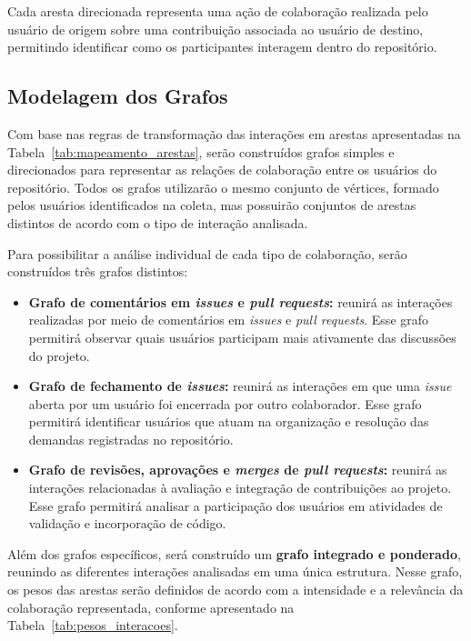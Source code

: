 \documentclass[12pt]{article}
\begin{document}
Cada aresta direcionada representa uma ação de colaboração realizada pelo usuário de origem sobre uma contribuição associada ao usuário de destino, permitindo identificar como os participantes interagem dentro do repositório.

\subsection{Modelagem dos Grafos}

Com base nas regras de transformação das interações em arestas apresentadas na Tabela~\ref{tab:mapeamento_arestas}, serão construídos grafos simples e direcionados para representar as relações de colaboração entre os usuários do repositório. Todos os grafos utilizarão o mesmo conjunto de vértices, formado pelos usuários identificados na coleta, mas possuirão conjuntos de arestas distintos de acordo com o tipo de interação analisada.

Para possibilitar a análise individual de cada tipo de colaboração, serão construídos três grafos distintos:

\begin{itemize}
    \item \textbf{Grafo de comentários em \textit{issues} e \textit{pull requests}:} reunirá as interações realizadas por meio de comentários em \textit{issues} e \textit{pull requests}. Esse grafo permitirá observar quais usuários participam mais ativamente das discussões do projeto.

    \item \textbf{Grafo de fechamento de \textit{issues}:} reunirá as interações em que uma \textit{issue} aberta por um usuário foi encerrada por outro colaborador. Esse grafo permitirá identificar usuários que atuam na organização e resolução das demandas registradas no repositório.

    \item \textbf{Grafo de revisões, aprovações e \textit{merges} de \textit{pull requests}:} reunirá as interações relacionadas à avaliação e integração de contribuições ao projeto. Esse grafo permitirá analisar a participação dos usuários em atividades de validação e incorporação de código.
\end{itemize}

Além dos grafos específicos, será construído um \textbf{grafo integrado e ponderado}, reunindo as diferentes interações analisadas em uma única estrutura. Nesse grafo, os pesos das arestas serão definidos de acordo com a intensidade e a relevância da colaboração representada, conforme apresentado na Tabela~\ref{tab:pesos_interacoes}.
\end{document}
